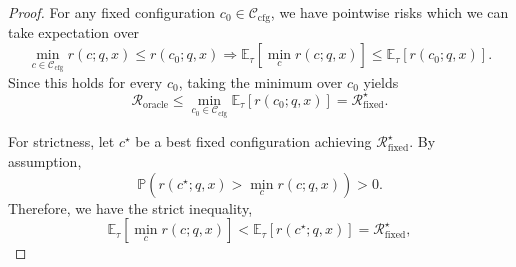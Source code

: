 \begin{proof}
For any fixed configuration $c_0\in\mathcal{C}_{\mathrm{cfg}}$, we have pointwise risks which we can take expectation over
\begin{equation}
\min_{c\in\mathcal{C}_{\mathrm{cfg}}} r(c;q,x)
\le
r(c_0;q,x)
\Longrightarrow
\mathbb{E}_{\tau}\!\left[\min_c r(c;q,x)\right]
\le
\mathbb{E}_{\tau}[r(c_0;q,x)].
\end{equation}
Since this holds for every $c_0$, taking the minimum over $c_0$ yields
\[
\mathcal{R}_{\mathrm{oracle}}
\le
\min_{c_0\in\mathcal{C}_{\mathrm{cfg}}}
\mathbb{E}_{\tau}[r(c_0;q,x)]
=
\mathcal{R}_{\mathrm{fixed}}^\star.
\]

For strictness, let $c^\star$ be a best fixed configuration achieving $\mathcal{R}_{\mathrm{fixed}}^\star$. By assumption,
\[
\mathbb{P}\!\left(
r(c^\star;q,x) >
\min_{c} r(c;q,x)
\right)>0.
\]
Therefore, we have the strict inequality,
\[
\mathbb{E}_{\tau}\!\left[\min_c r(c;q,x)\right]
<
\mathbb{E}_{\tau}[r(c^\star;q,x)]
=
\mathcal{R}_{\mathrm{fixed}}^\star,
\]
\end{proof}


